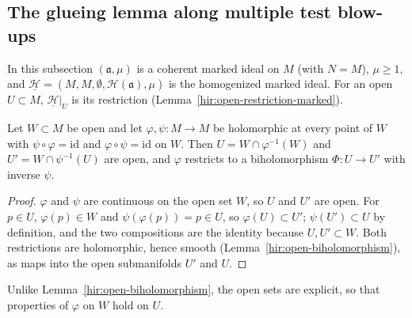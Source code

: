 \subsection{The glueing lemma along multiple test blow-ups}

In this subsection \((\mathfrak a,\mu)\) is a coherent marked ideal on \(M\) (with \(N=M\)), \(\mu\ge1\), and
\(\underline{\mathcal H}=(M,M,\emptyset,\mathcal H(\mathfrak a),\mu)\) is the homogenized marked ideal. For an open \(U\subset M\),
\(\underline{\mathcal H}|_U\) is its restriction (Lemma~\ref{hir:open-restriction-marked}).

\begin{lemma}
\label{mc:local-inverse-biholomorphism}
\leanok
Let \(W\subset M\) be open and let \(\varphi,\psi\colon M\to M\) be holomorphic at every point of \(W\) with \(\psi\circ\varphi=\mathrm{id}\) and
\(\varphi\circ\psi=\mathrm{id}\) on \(W\). Then \(U=W\cap\varphi^{-1}(W)\) and \(U'=W\cap\psi^{-1}(U)\) are open, and \(\varphi\) restricts to a biholomorphism
\(\Phi\colon U\to U'\) with inverse \(\psi\).
\end{lemma}
\begin{proof}
\leanok
\(\varphi\) and \(\psi\) are continuous on the open set \(W\), so \(U\) and \(U'\) are open. For \(p\in U\), \(\varphi(p)\in W\) and \(\psi(\varphi(p))=p\in U\), so
\(\varphi(U)\subset U'\); \(\psi(U')\subset U\) by definition, and the two compositions are the identity because \(U,U'\subset W\). Both restrictions are
holomorphic, hence smooth (Lemma~\ref{hir:open-biholomorphism}), as maps into the open submanifolds \(U'\) and \(U\).
\end{proof}
Unlike Lemma~\ref{hir:open-biholomorphism}, the open sets are explicit, so that properties of \(\varphi\) on \(W\) hold on \(U\).

